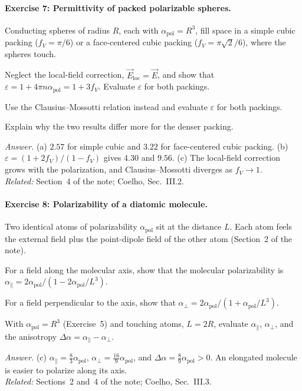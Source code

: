 \documentclass[11pt]{article}      %
\numberwithin{equation}{section}   %
\begin{document}
\paragraph{Exercise 7: Permittivity of packed polarizable spheres.}
Conducting spheres of radius $R$, each with $\alpha_{\text{pol}} = R^3$, fill space in a simple cubic packing ($f_V = \pi/6$) or a face-centered cubic packing ($f_V = \pi\sqrt2/6$), where the spheres touch.
\begin{parts}
    \item Neglect the local-field correction, $\vec E_{\text{loc}} = \vec E$, and show that $\varepsilon = 1 + 4\pi n\alpha_{\text{pol}} = 1 + 3f_V$. Evaluate $\varepsilon$ for both packings.
    \item Use the Clausius--Mossotti relation instead and evaluate $\varepsilon$ for both packings.
    \item Explain why the two results differ more for the denser packing.
\end{parts}
\textit{Answer.} (a) $2.57$ for simple cubic and $3.22$ for face-centered cubic packing. (b) $\varepsilon = (1 + 2f_V)/(1 - f_V)$ gives $4.30$ and $9.56$. (c) The local-field correction grows with the polarization, and Clausius--Mossotti diverges as $f_V \to 1$.\\
\textit{Related:} Section~4 of the note; Coelho, Sec.~III.2.

\paragraph{Exercise 8: Polarizability of a diatomic molecule.}
Two identical atoms of polarizability $\alpha_{\text{pol}}$ sit at the distance $L$. Each atom feels the external field plus the point-dipole field of the other atom (Section~2 of the note).
\begin{parts}
    \item For a field along the molecular axis, show that the molecular polarizability is $\alpha_\parallel = 2\alpha_{\text{pol}}/(1 - 2\alpha_{\text{pol}}/L^3)$.
    \item For a field perpendicular to the axis, show that $\alpha_\perp = 2\alpha_{\text{pol}}/(1 + \alpha_{\text{pol}}/L^3)$.
    \item With $\alpha_{\text{pol}} = R^3$ (Exercise~5) and touching atoms, $L = 2R$, evaluate $\alpha_\parallel$, $\alpha_\perp$, and the anisotropy $\Delta\alpha = \alpha_\parallel - \alpha_\perp$.
\end{parts}
\textit{Answer.} (c) $\alpha_\parallel = \tfrac{8}{3}\alpha_{\text{pol}}$, $\alpha_\perp = \tfrac{16}{9}\alpha_{\text{pol}}$, and $\Delta\alpha = \tfrac{8}{9}\alpha_{\text{pol}} > 0$. An elongated molecule is easier to polarize along its axis.\\
\textit{Related:} Sections~2 and~4 of the note; Coelho, Sec.~III.3.
\end{document}

